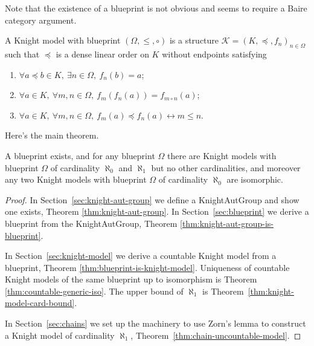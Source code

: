 Note that the existence of a blueprint is not obvious and seems to require a Baire category argument.

\begin{definition}
  \label{def:knight-model}
  \leanok
  A Knight model with blueprint $(\Omega, {\le}, {\circ})$ is a structure $\mathcal{K} = (K, {\preceq}, f_n)_{n \in \Omega}$ such that $\preceq$ is a dense linear order on $K$ without endpoints satisfying
  \begin{enumerate}
  \item $\forall a \preceq b \in K,\ \exists n \in \Omega,\ f_n(b) = a$;
  \item $\forall a \in K,\ \forall m, n \in \Omega,\ f_m(f_n(a)) = f_{m \circ n}(a)$;
  \item $\forall a \in K,\ \forall m, n \in \Omega,\ f_m(a) \preceq f_n(a) \leftrightarrow m \le n$.
  \end{enumerate}
\end{definition}

Here's the main theorem.

\begin{theorem}
  \label{thm:main-theorem}
  A blueprint exists, and for any blueprint $\Omega$ there are Knight models with blueprint $\Omega$ of cardinality $\aleph_0$ and $\aleph_1$ but no other cardinalities, and moreover any two Knight models with blueprint $\Omega$ of cardinality $\aleph_0$ are isomorphic.
\end{theorem}

\begin{proof}
  \leanok
  In Section~\ref{sec:knight-aut-group} we define a KnightAutGroup and show one exists, Theorem \ref{thm:knight-aut-group}.
  In Section~\ref{sec:blueprint} we derive a blueprint from the KnightAutGroup, Theorem \ref{thm:knight-aut-group-is-blueprint}.

  In Section~\ref{sec:knight-model} we derive a countable Knight model from a blueprint, Theorem \ref{thm:blueprint-is-knight-model}.
  Uniqueness of countable Knight models of the same blueprint up to isomorphism is Theorem \ref{thm:countable-generic-iso}.
  The upper bound of $\aleph_1$ is Theorem~\ref{thm:knight-model-card-bound}.

  In Section~\ref{sec:chains} we set up the machinery to use Zorn's lemma to construct a Knight model of cardinality $\aleph_1$, Theorem~\ref{thm:chain-uncountable-model}.
\end{proof}



